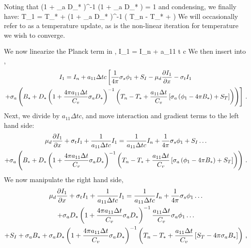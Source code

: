 Noting that 
\benum
\left(1 +  \sigma_a D_*  \right)^{-1} \left(1 +  \sigma_a D_* \right)  = 1 \pec
\eenum
and condensing, we finally have:
\benum
T_1 = T_* + \left(1 +  \sigma_a D_*  \right)^{-1} \left( T_n - T_* +    \right) \pep
\label{eq:analytic_t_1}
\eenum
We will occasionally refer to  as a temperature update, as  is the non-linear iteration for temperature we wish to converge.

We now linearize the Planck term in ,
\benum
I_1 = I_n + a_{11} \Delta t c  \pep
\label{eq:long_i_1_analytic}
\eenum
We then insert  into ,
\begin{multline}
I_1 = I_n + a_{11} \Delta t c \left[ \frac{1}{4\pi}\sigma_{s} \phi_1 + S_I - \mu_d \frac{\partial I_1}{\partial x} - \sigma_t I_1  \right. \\ 
\left. + \sigma_a \left(B_* + D_*\left(1 + \frac{4\pi a_{11} \Delta t}{C_v} \sigma_a D_*  \right)^{-1} \left( T_n - T_* + \frac{a_{11} \Delta t }{C_v} \left[ \sigma_a \left( \phi_1 - 4\pi   B_* \right) + S_T \right]  \right) \right) \right] \, .
\end{multline}
Next, we divide by $ a_{11} \Delta t c$, and move interaction and gradient terms to the left hand side:
\begin{multline}
\mu_d \frac{\partial I_1}{\partial x} + \sigma_t I_1 + \frac{1}{a_{11} \Delta t c} I_1 = \frac{1}{a_{11} \Delta t c}I_n + \frac{1}{4\pi}\sigma_{s} \phi_1 + S_I \dots \\
+ \sigma_a \left(B_* + D_*\left(1 + \frac{4\pi a_{11} \Delta t}{C_v} \sigma_a D_*  \right)^{-1} \left( T_n - T_* + \frac{a_{11} \Delta t }{C_v} \left[ \sigma_a \left( \phi_1 - 4\pi   B_* \right) + S_T \right]  \right) \right) \, .
\end{multline}
We now manipulate the right hand side,
\begin{multline}
\mu_d \frac{\partial I_1}{\partial x} + \sigma_t I_1 + \frac{1}{a_{11} \Delta t c} I_1 = \frac{1}{a_{11} \Delta t c}I_n + \frac{1}{4\pi}\sigma_{s} \phi_1  \dots \\ 
+  \sigma_a  D_*\left(1 + \frac{4\pi a_{11} \Delta t}{C_v} \sigma_a D_*  \right)^{-1} \frac{a_{11} \Delta t }{C_v} \sigma_a \phi_1  \dots \\
+ S_I + \sigma_a B_* 
+ \sigma_a D_*\left(1 + \frac{4\pi a_{11} \Delta t}{C_v} \sigma_a D_*  \right)^{-1} \left( T_n - T_* + \frac{a_{11} \Delta t }{C_v} \left[  S_T - 4\pi \sigma_a   B_*\right]  \right) \, ,
\end{multline}
